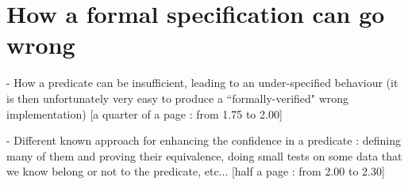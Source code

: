 \section{How a formal specification can go wrong}

- How a predicate can be insufficient, leading to an under-specified behaviour
(it is then unfortunately very easy to produce a ``formally-verified" wrong implementation)
[a quarter of a page : from 1.75 to 2.00]

- Different known approach for enhancing the confidence in a predicate : defining many of them and proving their equivalence, doing small tests on some data that we know belong or not to the predicate, etc... 
[half a page : from 2.00 to 2.30]
